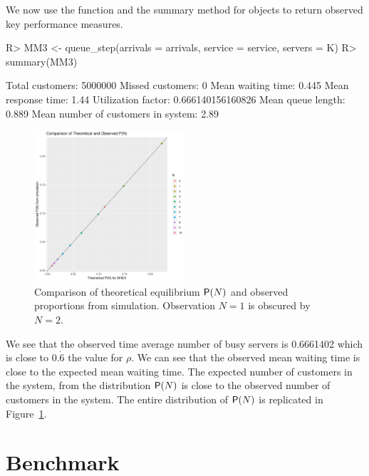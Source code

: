 \documentclass[article]{jss}
\begin{document}
We now use the  function and the summary method for  objects  to return observed key performance measures. 

\begin{CodeChunk}
\begin{Sinput}
R> MM3 <- queue_step(arrivals = arrivals, service = service, servers = K)
R> summary(MM3)
\end{Sinput}
\begin{Soutput}
Total customers:
 5000000
Missed customers:
 0
Mean waiting time:
 0.445
Mean response time:
 1.44
Utilization factor:
 0.666140156160826
Mean queue length:
 0.889
Mean number of customers in system:
 2.89
\end{Soutput}
\end{CodeChunk}

\begin{figure}[!htb]
  \centering
  \includegraphics[width = 0.5\textwidth]{Figures/theoretical.pdf}
  \caption{Comparison of theoretical equilibrium $\mathsf{P}(N)$ and observed proportions from simulation. Observation $N = 1$ is obscured by $N = 2$.}
  \label{fig:theoretical}
\end{figure}

We see that the observed time average number of busy servers is 0.6661402 which is close to $0.\dot{6}$ the value for $\rho$. We can see that the observed mean waiting time is close to the expected mean waiting time. The expected number of customers in the system, from the distribution $\mathsf{P}(N)$ is close to the observed number of customers in the system. The entire distribution of $\mathsf{P}(N)$ is replicated in Figure~\ref{fig:theoretical}. 

\section{Benchmark} \label{sec:Benchmark}
\end{document}
